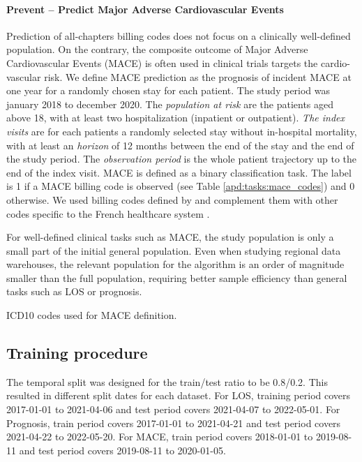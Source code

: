 \documentclass[french,12pt,twoside,a4paper]{book}
\begin{document}
\begin{appendices}
  \paragraph{Prevent -- Predict Major Adverse Cardiovascular Events}%
  \label{apd:task_details:mace}

  Prediction of all-chapters billing codes does not focus on a clinically
  well-defined population. On the contrary, the composite outcome of Major Adverse
  Cardiovascular Events (MACE) is often used in clinical trials targets the
  cardio-vascular risk. We define MACE prediction as the prognosis of incident
  MACE at one year for a randomly chosen stay for each patient.
  The study period was january 2018 to december 2020. The \emph{population at
    risk} are the patients aged above 18, with at least two hospitalization
  (inpatient or outpatient). \emph{The index visits} are for each patients a
  randomly selected stay without in-hospital mortality, with at least an
  \emph{horizon} of 12 months between the end of the stay and the end of the study
  period. The \emph{observation period} is the whole patient trajectory up to the
  end of the index visit. MACE is defined as a binary classification task. The
  label is 1 if a MACE billing code is observed (see Table
  \ref{apd:tasks:mace_codes}) and 0 otherwise. We used billing codes defined by
  \cite{bosco2021major} and complement them with other codes specific to the
  French healthcare system \cite{cnam2022_top_patho}.

  For well-defined clinical tasks such as MACE, the study population is only a
  small part of the initial general population. Even when studying regional data
  warehouses, the relevant population for the algorithm is an order of magnitude
  smaller than the full population, requiring better sample efficiency than
  general tasks such as LOS or prognosis.

  \begin{table}[!tb]
    \resizebox*{\textwidth}{!}{
      
    } \caption{ICD10 codes used for MACE definition.}\label{apd:tasks:mace_codes}
  \end{table}

  \subsection{Training procedure}\label{apd:evaluation_procedure}

  The temporal split was designed for the train/test ratio to be 0.8/0.2. This
  resulted in different split dates for each dataset. For LOS, training period
  covers 2017-01-01 to 2021-04-06 and test period covers 2021-04-07 to 2022-05-01.
  For Prognosis, train period covers 2017-01-01 to 2021-04-21 and test period
  covers 2021-04-22 to 2022-05-20. For MACE, train period covers 2018-01-01 to
  2019-08-11 and test period covers 2019-08-11 to 2020-01-05.


\end{appendices}
\end{document}
